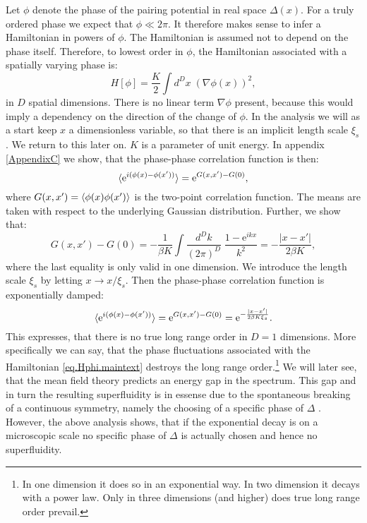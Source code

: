 Let $\phi$ denote the phase of the pairing potential in real space $\Delta(x)$. For a truly ordered phase we expect that $\phi \ll 2\pi$. It therefore makes sense to infer a Hamiltonian in powers of $\phi$. The Hamiltonian is assumed not to depend on the phase itself. Therefore, to lowest order in $\phi$, the Hamiltonian associated with a spatially varying phase is: 
\begin{equation}
H[\phi] = \frac{K}{2}\int d^{D}x \; \left(\nabla \phi(x)\right)^2, 
\label{eq.Hphi.maintext}
\end{equation}
in $D$ spatial dimensions. There is no linear term $\nabla \phi$ present, because this would imply a dependency on the direction of the change of $\phi$. 
In the analysis we will as a start keep $x$ a dimensionless variable, so that there is an implicit length scale $\xi_s$. We return to this later on. $K$ is a parameter of unit energy. In appendix \ref{AppendixC} we show, that the phase-phase correlation function is then:
\begin{equation}
\braket{ \text{e}^{i(\phi(x)- \phi(x'))} } = \text{e}^{G(x,x') - G(0)}, \nonumber
\end{equation}
where $G(x,x') = \braket{\phi(x)\phi(x')}$ is the two-point correlation function. The means are taken with respect to the underlying Gaussian distribution. Further, we show that:
\begin{equation}
G(x,x') - G(0) = -\frac{1}{\beta K}\int \frac{d^{D}k}{(2\pi)^D}\; \frac{1 - \text{e}^{ikx}}{k^2} = -\frac{|x - x'|}{2\beta K}, \nonumber 
\end{equation}
where the last equality is only valid in one dimension. We introduce the length scale $\xi_s$ by letting $x \to x / \xi_s$. Then the phase-phase correlation function is exponentially damped: 
\begin{equation}
\braket{ \text{e}^{i(\phi(x)- \phi(x'))} } = \text{e}^{G(x,x') - G(0)} = \text{e}^{-\frac{|x - x'|}{2\beta K \xi_s}}. 
\label{eq.phasecorrelationfunction.onedimension.maintext} 
\end{equation}
This expresses, that there is no true long range order in $D = 1$ dimensions. More specifically we can say, that the phase fluctuations associated with the Hamiltonian \eqref{eq.Hphi.maintext} destroys the long range order.\footnote{In one dimension it does so in an exponential way. In two dimension it decays with a power law. Only in three dimensions (and higher) does true long range order prevail.} We will later see, that the mean field theory predicts an energy gap in the spectrum. This gap and in turn the resulting superfluidity is in essense due to the spontaneous breaking of a continuous symmetry, namely the choosing of a specific phase of $\Delta$ \cite[pp. 71-72]{BruusFlensberg}. However, the above analysis shows, that if the exponential decay is on a microscopic scale no specific phase of $\Delta$ is actually chosen and hence no superfluidity. 

